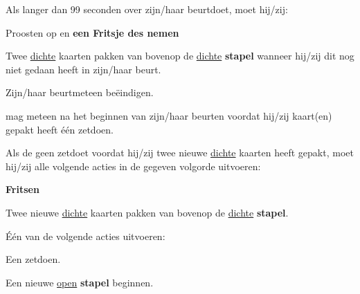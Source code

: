 \newpage
{}
\label{sec:beurten_en_zetten_start}


\vervolgLijst{}
    \item Als \eenSpeler langer dan 99 seconden over zijn/haar beurt\footnotemark[1] doet, moet hij/zij:
    \puntLijst{}
        \item Proosten op  en \textbf{een Fritsje des nemen}\footnotemark[2]
        \item Twee \ul{dichte} kaarten pakken van bovenop de \ul{dichte} \textbf{stapel} wanneer hij/zij dit nog niet gedaan heeft in zijn/haar beurt.
        \item Zijn/haar beurt\footnotemark[1] meteen beëindigen.
    \eindPuntLijst{}
    \label{regel:beurt_langer_dan_99}
\eindLijst{}


\vervolgLijst{}
    \item \EenSpeler mag meteen na het beginnen van zijn/haar beurt\footnotemark[1] en voordat hij/zij kaart(en) gepakt heeft \'e\'en zet\footnotemark[3] doen.
    \label{regel:zet_zonder_pakker}
\eindLijst{}

\vervolgLijst{}
    \item \label{regel:twee_kaarten} Als de \huidigeSpeler geen zet\footnotemark[3] doet voordat hij/zij twee nieuwe \ul{dichte} kaarten heeft gepakt, moet hij/zij alle volgende acties in de gegeven volgorde uitvoeren:
    \puntLijst{}
        \item \textbf{Fritsen}
        \item Twee nieuwe \ul{dichte} kaarten pakken van bovenop de \ul{dichte} \textbf{stapel}.
        \item Één van de volgende acties uitvoeren:
        \numeriekeLijst{}
            \item Een zet\footnotemark[3] doen.
            \item Een nieuwe \ul{open} \textbf{stapel} beginnen.
        \eindNumeriekeLijst{}
     \eindPuntLijst{}
\eindLijst{}

